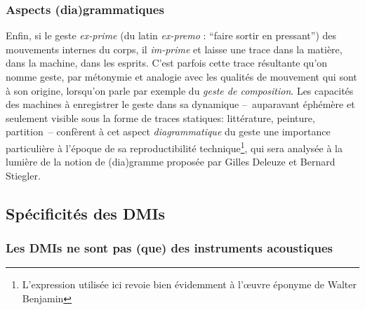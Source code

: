 \subsubsection{Aspects (dia)grammatiques}

\noindent Enfin, si le geste \textit{ex-prime} (du latin \textit{ex-premo} : ``faire sortir en pressant'') des mouvements internes du corps, il \textit{im-prime} et laisse une trace dans la matière, dans la machine, dans les esprits. C'est parfois cette trace résultante qu'on nomme geste, par métonymie et analogie avec les qualités de mouvement qui sont à son origine, lorsqu'on parle par exemple du \textit{geste de composition}. Les capacités des machines à enregistrer le geste dans sa dynamique --~auparavant éphémère et seulement visible sous la forme de traces statiques: littérature, peinture, partition~-- confèrent à cet aspect \textit{diagrammatique} du geste une importance particulière à l'époque de sa reproductibilité technique\footnote{L'expression utilisée ici revoie bien évidemment à l'œuvre éponyme de Walter Benjamin\cite{benjamin_loeuvre_2013}}, qui sera analysée à la lumière de la notion de (dia)gramme proposée par Gilles Deleuze et Bernard Stiegler.




\subsection{Spécificités des DMIs}

\subsubsection{Les DMIs ne sont pas (que) des instruments acoustiques}


